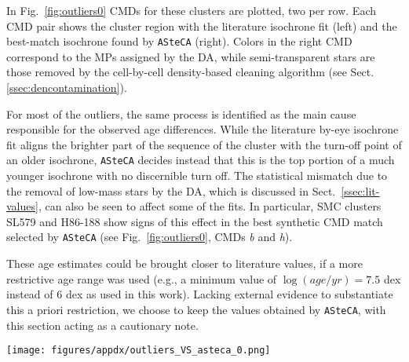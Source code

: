 \documentclass[draft]{aa}
\renewcommand{\includegraphics}[2][]{}
\begin{document}
\begin{appendix}
In Fig.~\ref{fig:outliers0} CMDs for these clusters are plotted, two per row.
Each CMD pair shows the cluster region with the literature isochrone fit (left)
and the best-match isochrone found by \texttt{ASteCA} (right).
%
Colors in the right CMD correspond to the MPs assigned by the DA, while
semi-transparent stars are those removed by the cell-by-cell density-based
cleaning algorithm (see Sect.\ref{ssec:dencontamination}).
%

For most of the outliers, the same process is identified as the main
cause responsible for the observed age differences.
While the literature by-eye isochrone fit aligns the brighter
part of the sequence of the cluster with the turn-off point of an older
isochrone, \texttt{ASteCA} decides instead that this is the top portion of a
much younger isochrone with no discernible turn off.
%
The statistical mismatch due to the removal of low-mass stars by the DA,
which is discussed in Sect.~\ref{ssec:lit-values}, can also be seen to affect some
of the fits. In particular, SMC clusters SL579 and H86-188 show signs of
this effect in the best synthetic CMD match selected by \texttt{ASteCA}
(see Fig.~\ref{fig:outliers0}, CMDs \emph{b} and \emph{h}).

These age estimates could be brought closer to literature values, if a more
restrictive age range was used (e.g., a minimum value of $\log(age/yr){=}7.5$
dex instead of 6 dex as used in this work).
Lacking external evidence to substantiate this a priori restriction, we choose
to keep the values obtained by \texttt{ASteCA}, with this section acting as a
cautionary note.

\begin{figure*}
\texttt{[image: figures/appdx/outliers\_VS\_asteca\_0.png]}
\caption{CMDs for the outliers set. Description of the plots in the main
text of the section.}
\label{fig:outliers0}
\end{figure*}






\end{appendix}
\end{document}
